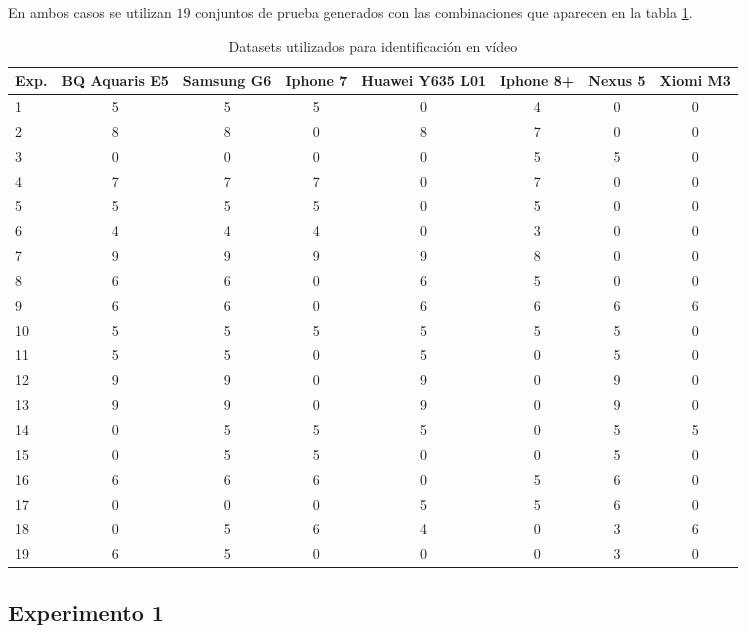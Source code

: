 En ambos casos se utilizan $19$ conjuntos de prueba generados con las combinaciones que aparecen en la tabla \ref{tabla:10exp}.

\begin{table}[!htb]
    \tiny
    \centering
        \begin{tabular}{|l|c|c|c|c|c|c|c|}
        \hline
        \rowcolor[gray]{0.9}
        \textbf{Exp.} & \textbf{BQ Aquaris E5} & \textbf{Samsung G6} & \textbf{Iphone 7} & \textbf{Huawei Y635 L01} & \textbf{Iphone 8+} & \textbf{Nexus 5} & \textbf{Xiomi M3} \\ \hline
        1 & 5 & 5 & 5 & 0 & 4 & 0 & 0 \\ \hline
        2 & 8 & 8 & 0 & 8 & 7 & 0 & 0 \\ \hline
        3 & 0 & 0 & 0 & 0 & 5 & 5 & 0 \\ \hline
        4 & 7 & 7 & 7 & 0 & 7 & 0 & 0 \\ \hline
        5 & 5 & 5 & 5 & 0 & 5 & 0 & 0 \\ \hline
        6 & 4 & 4 & 4 & 0 & 3 & 0 & 0 \\ \hline
        7 & 9 & 9 & 9 & 9 & 8 & 0 & 0 \\ \hline
        8 & 6 & 6 & 0 & 6 & 5 & 0 & 0 \\ \hline
        9 & 6 & 6 & 0 & 6 & 6 & 6 & 6 \\ \hline
        10 & 5 & 5 & 5 & 5 & 5 & 5 & 0 \\ \hline
        11 & 5 & 5 & 0 & 5 & 0 & 5 & 0 \\ \hline
        12 & 9 & 9 & 0 & 9 & 0 & 9 & 0 \\ \hline
        13 & 9 & 9 & 0 & 9 & 0 & 9 & 0 \\ \hline
        14 & 0 & 5 & 5 & 5 & 0 & 5 & 5 \\ \hline
        15 & 0 & 5 & 5 & 0 & 0 & 5 & 0 \\ \hline
        16 & 6 & 6 & 6 & 0 & 5 & 6 & 0 \\ \hline
        17 & 0 & 0 & 0 & 5 & 5 & 6 & 0 \\ \hline
        18 & 0 & 5 & 6 & 4 & 0 & 3 & 6 \\ \hline
        19 & 6 & 5 & 0 & 0 & 0 & 3 & 0 \\ \hline
        \end{tabular}
    \caption{Datasets utilizados para identificación en vídeo}
    \label{tabla:10exp}
\end{table}



\subsection{Experimento 1}

